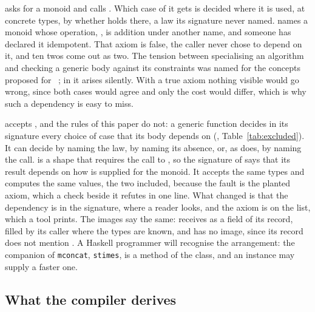  asks for a monoid and calls .
Which case of  it gets is decided where it is used, at concrete types, by whether  holds there, a law its signature never named.
 names a monoid whose operation, , is addition under another name, and someone has declared it idempotent.
That axiom is false, the caller never chose to depend on it, and ten twos come out as two.
The tension between specialising an algorithm and checking a generic body against its constraints was named for the concepts proposed for ~\cite{jarvi2006specialization}; in  it arises silently.
With a true axiom nothing visible would go wrong, since both cases would agree and only the cost would differ, which is why such a dependency is easy to miss.

\Cpp{} accepts , and the rules of this paper do not: a generic function decides in its signature every choice of case that its body depends on (\RuleTwo{}, Table~\ref{tab:excluded}).
It can decide by naming the law, by naming its absence, or, as  does, by naming the call.
 is a shape that requires the call to , so the signature of  says that its result depends on how  is supplied for the monoid.
It accepts the same types and computes the same values, the two included, because the fault is the planted axiom, which a check beside it refutes in one line.
What changed is that the dependency is in the signature, where a reader looks, and the axiom is on the list, which a tool prints.
The images say the same:  receives  as a field of its record, filled by its caller where the types are known, and  has no image, since its record does not mention .
A Haskell programmer will recognise the arrangement: the companion of \texttt{mconcat}, \texttt{stimes}, is a method of the class, and an instance may supply a faster one.

\subsection{What the compiler derives}
\label{sec:examples:inference}

